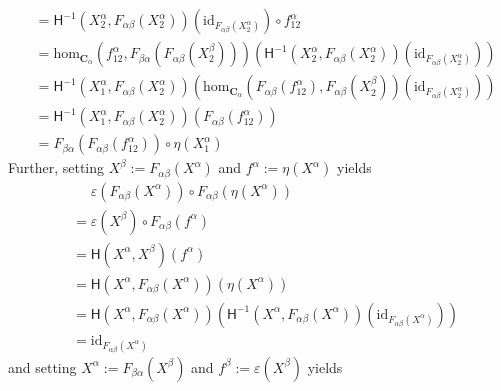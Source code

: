 \begin{prf}
\begin{description}
\begin{align*}
  &=
  \mathsf{H}^{-1}
  \left(
    X_{2}^{\alpha},
    F_{\alpha\beta}(X_{2}^{\alpha})
  \right)
  \left(
    \mathrm{id}_{F_{\alpha\beta}(X_{2}^{\alpha})}
  \right)
  \circ
  f_{12}^{\alpha}
  \\
  &=
  \mathrm{hom}_{\mathbf{C}_{\alpha}}
  \left(
    f_{12}^{\alpha},
    F_{\beta\alpha}
    \left(
      F_{\alpha\beta}(X_{2}^{\beta})
    \right)
  \right)
  \left(
    \mathsf{H}^{-1}
    \left(
      X_{2}^{\alpha},
      F_{\alpha\beta}(X_{2}^{\alpha})
    \right)
    \left(
      \mathrm{id}_{F_{\alpha\beta}(X_{2}^{\alpha})}
    \right)
  \right)
  \\
  &=
  \mathsf{H}^{-1}
    \left(
      X_{1}^{\alpha},
      F_{\alpha\beta}(X_{2}^{\alpha})
    \right)
  \left(
    \mathrm{hom}_{\mathbf{C}_{\alpha}}
    \left(
      F_{\alpha\beta}(f_{12}^{\alpha}),
      F_{\alpha\beta}(X_{2}^{\beta})
    \right)
    \left(
      \mathrm{id}_{F_{\alpha\beta}(X_{2}^{\alpha})}
    \right)
  \right)
  \tag{NT}
  \\
  &=
  \mathsf{H}^{-1}
    \left(
      X_{1}^{\alpha},
      F_{\alpha\beta}(X_{2}^{\alpha})
    \right)
  \left(
    F_{\alpha\beta}(f_{12}^{\alpha})
  \right)
  \\
  &=
  F_{\beta\alpha}
  \left(
    F_{\alpha\beta}(f_{12}^{\alpha})
  \right)
  \circ
  \eta(X_{1}^{\alpha})
\end{align*}
Further, setting $X^{\beta} := F_{\alpha\beta}(X^{\alpha})$ and $f^{\alpha} := \eta(X^{\alpha})$ yields
\begin{align*}
  &\phantom{=}
  \varepsilon
  \left(
    F_{\alpha\beta}(X^{\alpha})
  \right)
  \circ
  F_{\alpha\beta}
  \left(
    \eta(X^{\alpha})
  \right)
  \\
  &=
  \varepsilon(X^{\beta})
  \circ
  F_{\alpha\beta}(f^{\alpha})
  \\
  &=
  \mathsf{H}(X^{\alpha},X^{\beta})(f^{\alpha})
  \\
  &=
  \mathsf{H}
  \left(
    X^{\alpha},
    F_{\alpha\beta}(X^{\alpha})
  \right)
  \left(
    \eta(X^{\alpha})
  \right)
  \\
  &=
  \mathsf{H}
  \left(
    X^{\alpha},
    F_{\alpha\beta}(X^{\alpha})
  \right)
  \left(
    \mathsf{H}^{-1}
    \left(
      X^{\alpha},
      F_{\alpha\beta}(X^{\alpha})
    \right)
    \left(
      \mathrm{id}_{F_{\alpha\beta}(X^{\alpha})}
    \right)
  \right)
  \\
  &=
  \mathrm{id}_{F_{\alpha\beta}(X^{\alpha})}
\end{align*}
and setting $X^{\alpha} := F_{\beta\alpha}(X^{\beta})$ and $f^{\beta} := \varepsilon(X^{\beta})$ yields

\end{description}
\end{prf}

